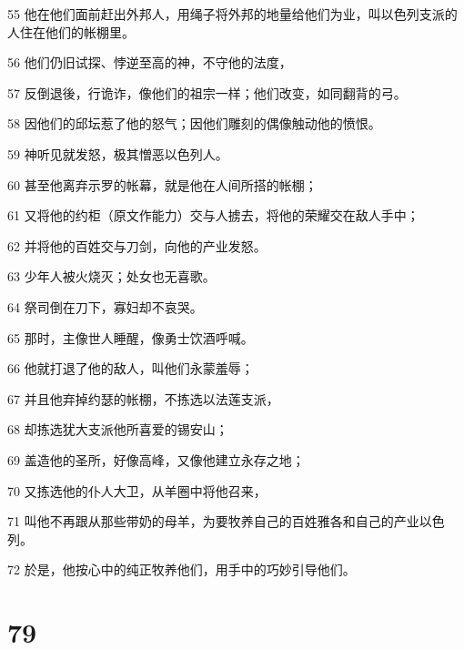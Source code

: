 \par 55 他在他们面前赶出外邦人，用绳子将外邦的地量给他们为业，叫以色列支派的人住在他们的帐棚里。
\par 56 他们仍旧试探、悖逆至高的神，不守他的法度，
\par 57 反倒退後，行诡诈，像他们的祖宗一样；他们改变，如同翻背的弓。
\par 58 因他们的邱坛惹了他的怒气；因他们雕刻的偶像触动他的愤恨。
\par 59 神听见就发怒，极其憎恶以色列人。
\par 60 甚至他离弃示罗的帐幕，就是他在人间所搭的帐棚；
\par 61 又将他的约柜（原文作能力）交与人掳去，将他的荣耀交在敌人手中；
\par 62 并将他的百姓交与刀剑，向他的产业发怒。
\par 63 少年人被火烧灭；处女也无喜歌。
\par 64 祭司倒在刀下，寡妇却不哀哭。
\par 65 那时，主像世人睡醒，像勇士饮酒呼喊。
\par 66 他就打退了他的敌人，叫他们永蒙羞辱；
\par 67 并且他弃掉约瑟的帐棚，不拣选以法莲支派，
\par 68 却拣选犹大支派他所喜爱的锡安山；
\par 69 盖造他的圣所，好像高峰，又像他建立永存之地；
\par 70 又拣选他的仆人大卫，从羊圈中将他召来，
\par 71 叫他不再跟从那些带奶的母羊，为要牧养自己的百姓雅各和自己的产业以色列。
\par 72 於是，他按心中的纯正牧养他们，用手中的巧妙引导他们。

\chapter{79}

